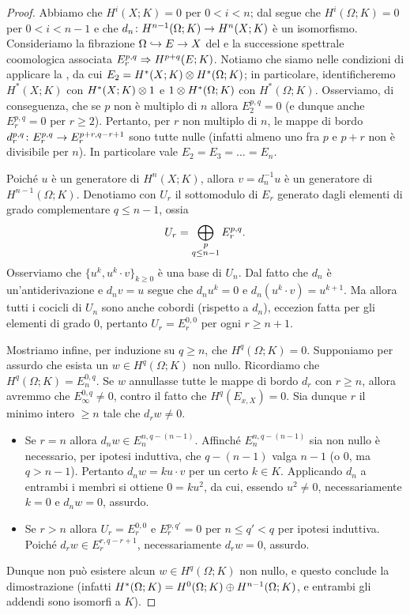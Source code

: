\begin{proof}
Abbiamo che \(H^i(X;K)=0\) per \(0<i<n\); dal  segue che \(H^i(\Omega;K)=0\) per \(0<i<n-1\) e che \(\map{d_n}{H^{n-1}(\Omega;K)}{H^n(X;K)}\) è un isomorfismo. Consideriamo la fibrazione \(\Omega\hookrightarrow E\to X\) del  e la successione spettrale coomologica associata \(E^{p,q}_r\Rightarrow H^{p+q}(E;K)\). Notiamo che siamo nelle condizioni di applicare la , da cui \(E_2=H^*(X;K)\mathbin{\otimes} H^*(\Omega;K)\); in particolare, identificheremo \(H^*(X;K)\) con \(H^*(X;K)\mathbin{\otimes} 1\) e \(1\mathbin{\otimes} H^*(\Omega;K)\) con \(H^*(\Omega;K)\). Osserviamo, di conseguenza, che se \(p\) non è multiplo di \(n\) allora \(E^{p,q}_2=0\) (e dunque anche \(E^{p,q}_r=0\) per \(r\ge2\)). Pertanto, per \(r\) non multiplo di \(n\), le mappe di bordo \(\map{d^{p,q}_r}{E^{p,q}_r}{E^{p+r,q-r+1}_r}\) sono tutte nulle (infatti almeno uno fra \(p\) e \(p+r\) non è divisibile per \(n\)). In particolare vale \(E_2=E_3=\ldots=E_n\).

Poiché \(u\) è un generatore di \(H^n(X;K)\), allora \(v=d_n^{-1}u\) è un generatore di \(H^{n-1}(\Omega;K)\). Denotiamo con \(U_r\) il sottomodulo di \(E_r\) generato dagli elementi di grado complementare \(q\le n-1\), ossia
\[
U_r=\bigoplus_{\substack{p\\q\le n-1}}E^{p,q}_r.
\]
Osserviamo che \(\{u^k,u^k\cdot v\}_{k\ge 0}\) è una base di \(U_n\). Dal fatto che \(d_n\) è un'antiderivazione e \(d_nv=u\) segue che \(d_n u^k=0\) e \(d_n(u^k\cdot v)=u^{k+1}\). Ma allora tutti i cocicli di \(U_n\) sono anche cobordi (rispetto a \(d_n\)), eccezion fatta per gli elementi di grado \(0\), pertanto \(U_r=E^{0,0}_r\) per ogni \(r\ge n+1\).

Mostriamo infine, per induzione su \(q\ge n\), che \(H^q(\Omega;K)=0\). Supponiamo per assurdo che esista un \(w\in H^q(\Omega;K)\) non nullo. Ricordiamo che \(H^q(\Omega;K)=E^{0,q}_n\). Se \(w\) annullasse tutte le mappe di bordo \(d_r\) con \(r\ge n\), allora avremmo che \(E^{0,q}_\infty\neq 0\), contro il fatto che \(H^q(E_{x,X})=0\). Sia dunque \(r\) il minimo intero \(\ge n\) tale che \(d_rw\neq 0\).
\begin{itemize}
\item Se \(r=n\) allora \(d_nw\in E^{n,q-(n-1)}_n\). Affinché \(E^{n,q-(n-1)}_n\) sia non nullo è necessario, per ipotesi induttiva, che \(q-(n-1)\) valga \(n-1\) (o \(0\), ma \(q>n-1\)). Pertanto \(d_nw=ku\cdot v\) per un certo \(k\in K\). Applicando \(d_n\) a entrambi i membri si ottiene \(0=ku^2\), da cui, essendo \(u^2\neq 0\), necessariamente \(k=0\) e \(d_nw=0\), assurdo.
\item Se \(r>n\) allora \(U_r=E^{0,0}_r\) e \(E^{p,q'}_r=0\) per \(n\le q'<q\) per ipotesi induttiva. Poiché \(d_rw\in E^{r,q-r+1}_r\), necessariamente \(d_rw=0\), assurdo.
\end{itemize}
Dunque non può esistere alcun \(w\in H^q(\Omega;K)\) non nullo, e questo conclude la dimostrazione (infatti \(H^*(\Omega;K)=H^0(\Omega;K)\mathbin{\oplus} H^{n-1}(\Omega;K)\), e entrambi gli addendi sono isomorfi a \(K\)).
\end{proof}
